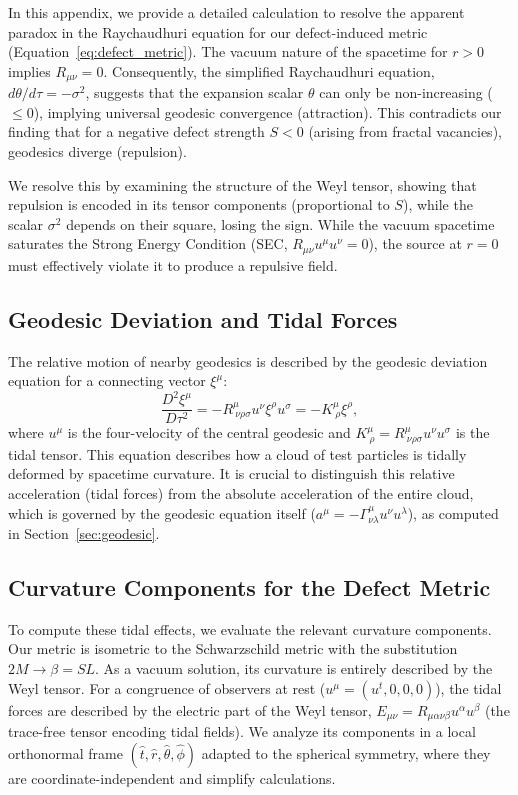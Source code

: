 \documentclass[%
  reprint,
  superscriptaddress,
  showpacs,
  showkeys,
  amsmath,amssymb,
  pra,
  longbibliography,
  floatfix,
]{revtex4-2}
\begin{document}
In this appendix, we provide a detailed calculation to resolve the apparent paradox in the Raychaudhuri equation for our defect-induced metric (Equation~\ref{eq:defect_metric}). The vacuum nature of the spacetime for $r > 0$ implies $R_{\mu\nu} = 0$. Consequently, the simplified Raychaudhuri equation, $d\theta/d\tau = -\sigma^2$, suggests that the expansion scalar $\theta$ can only be non-increasing ($\leq 0$), implying universal geodesic convergence (attraction). This contradicts our finding that for a negative defect strength $S<0$ (arising from fractal vacancies), geodesics diverge (repulsion).

We resolve this by examining the structure of the Weyl tensor, showing that repulsion is encoded in its tensor components (proportional to $S$), while the scalar $\sigma^2$ depends on their square, losing the sign. While the vacuum spacetime saturates the Strong Energy Condition (SEC, $R_{\mu\nu} u^\mu u^\nu = 0$), the source at $r=0$ must effectively violate it to produce a repulsive field.

\subsection{Geodesic Deviation and Tidal Forces}
The relative motion of nearby geodesics is described by the geodesic deviation equation for a connecting vector $\xi^\mu$:
\begin{equation}
\frac{D^2 \xi^\mu}{D\tau^2} = - R^\mu_{\ \nu\rho\sigma} u^\nu \xi^\rho u^\sigma = -K^\mu_{\ \rho} \xi^\rho,
\label{eq:geodev}
\end{equation}
where $u^\mu$ is the four-velocity of the central geodesic and $K^\mu_{\ \rho} = R^\mu_{\ \nu\rho\sigma} u^\nu u^\sigma$ is the tidal tensor. This equation describes how a cloud of test particles is tidally deformed by spacetime curvature. It is crucial to distinguish this relative acceleration (tidal forces) from the absolute acceleration of the entire cloud, which is governed by the geodesic equation itself ($a^\mu = -\Gamma^\mu_{\nu\lambda} u^\nu u^\lambda$), as computed in Section~\ref{sec:geodesic}.

\subsection{Curvature Components for the Defect Metric}
To compute these tidal effects, we evaluate the relevant curvature components. Our metric is isometric to the Schwarzschild metric with the substitution $2M \to \beta = SL$. As a vacuum solution, its curvature is entirely described by the Weyl tensor. For a congruence of observers at rest ($u^\mu = (u^t, 0, 0, 0)$), the tidal forces are described by the electric part of the Weyl tensor, $E_{\mu\nu} = R_{\mu\alpha\nu\beta}u^\alpha u^\beta$ (the trace-free tensor encoding tidal fields). We analyze its components in a local orthonormal frame $(\hat{t}, \hat{r}, \hat{\theta}, \hat{\phi})$ adapted to the spherical symmetry, where they are coordinate-independent and simplify calculations.
\end{document}
